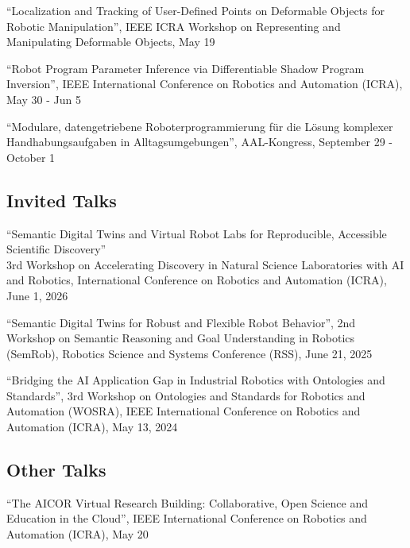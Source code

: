 \documentclass[11pt]{article} %
\begin{document}
\medskip

``Localization and Tracking of User-Defined Points on Deformable Objects for Robotic Manipulation'', IEEE ICRA Workshop on Representing and Manipulating Deformable Objects, May 19

\medskip

``Robot Program Parameter Inference via Differentiable Shadow Program Inversion'', IEEE International Conference on Robotics and Automation (ICRA), May 30 - Jun 5

\medskip


``Modulare, datengetriebene Roboterprogrammierung für die Lösung komplexer Handhabungsaufgaben in Alltagsumgebungen'', AAL-Kongress, September 29 - October 1

\subsection*{Invited Talks}

``Semantic Digital Twins and Virtual Robot Labs for Reproducible, Accessible Scientific Discovery''\\
3rd Workshop on Accelerating Discovery in Natural Science Laboratories with AI and Robotics, 
International Conference on Robotics and Automation (ICRA), June 1, 2026

\medskip

``Semantic Digital Twins for Robust and Flexible Robot Behavior'', 2nd Workshop on Semantic Reasoning and Goal Understanding in Robotics (SemRob), Robotics Science and Systems Conference (RSS), June 21, 2025 

\medskip

``Bridging the AI Application Gap in Industrial Robotics with Ontologies and Standards'', 3rd Workshop on Ontologies and Standards for Robotics and Automation (WOSRA), IEEE International Conference on Robotics and Automation (ICRA), May 13, 2024

\subsection*{Other Talks}


``The AICOR Virtual Research Building: Collaborative, Open Science and Education in the Cloud'', IEEE International Conference on Robotics and Automation (ICRA), May 20\\
\end{document}
